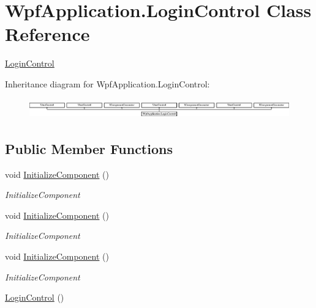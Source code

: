 \hypertarget{class_wpf_application_1_1_login_control}{\section{Wpf\-Application.\-Login\-Control Class Reference}
\label{class_wpf_application_1_1_login_control}
}


\hyperlink{class_wpf_application_1_1_login_control}{Login\-Control}  


Inheritance diagram for Wpf\-Application.\-Login\-Control\-:\begin{figure}[H]
\begin{center}
\leavevmode
\includegraphics[height=0.883978cm]{class_wpf_application_1_1_login_control}
\end{center}
\end{figure}
\subsection*{Public Member Functions}
\begin{DoxyCompactItemize}
\item 
void \hyperlink{class_wpf_application_1_1_login_control_a62d93567bf185939bfc48026ab715d24}{Initialize\-Component} ()
\begin{DoxyCompactList}\small\item\em Initialize\-Component \end{DoxyCompactList}\item 
void \hyperlink{class_wpf_application_1_1_login_control_a62d93567bf185939bfc48026ab715d24}{Initialize\-Component} ()
\begin{DoxyCompactList}\small\item\em Initialize\-Component \end{DoxyCompactList}\item 
void \hyperlink{class_wpf_application_1_1_login_control_a62d93567bf185939bfc48026ab715d24}{Initialize\-Component} ()
\begin{DoxyCompactList}\small\item\em Initialize\-Component \end{DoxyCompactList}\item 
\hyperlink{class_wpf_application_1_1_login_control_abeed066cd62a32a76bdbe5e520d52da4}{Login\-Control} ()
\end{DoxyCompactItemize}


